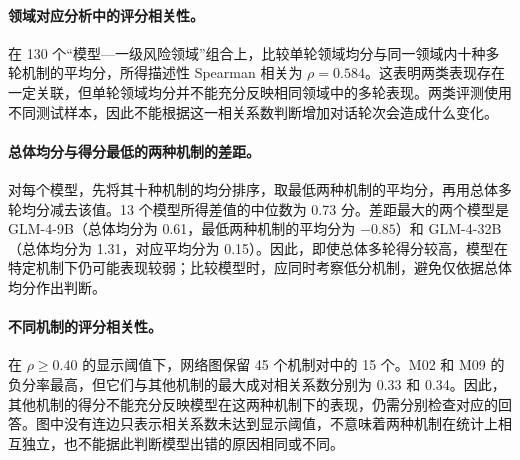 \paragraph{领域对应分析中的评分相关性。}
在 130 个“模型—一级风险领域”组合上，比较单轮领域均分与同一领域内十种多轮机制的平均分，所得描述性 Spearman 相关为 $\rho=0.584$。这表明两类表现存在一定关联，但单轮领域均分并不能充分反映相同领域中的多轮表现。两类评测使用不同测试样本，因此不能根据这一相关系数判断增加对话轮次会造成什么变化。

\paragraph{总体均分与得分最低的两种机制的差距。}
对每个模型，先将其十种机制的均分排序，取最低两种机制的平均分，再用总体多轮均分减去该值。13 个模型所得差值的中位数为 0.73 分。差距最大的两个模型是 GLM-4-9B（总体均分为 0.61，最低两种机制的平均分为 $-0.85$）和 GLM-4-32B（总体均分为 1.31，对应平均分为 0.15）。因此，即使总体多轮得分较高，模型在特定机制下仍可能表现较弱；比较模型时，应同时考察低分机制，避免仅依据总体均分作出判断。

\paragraph{不同机制的评分相关性。}
在 $\rho\geq0.40$ 的显示阈值下，网络图保留 45 个机制对中的 15 个。M02 和 M09 的负分率最高，但它们与其他机制的最大成对相关系数分别为 0.33 和 0.34。因此，其他机制的得分不能充分反映模型在这两种机制下的表现，仍需分别检查对应的回答。图中没有连边只表示相关系数未达到显示阈值，不意味着两种机制在统计上相互独立，也不能据此判断模型出错的原因相同或不同。
